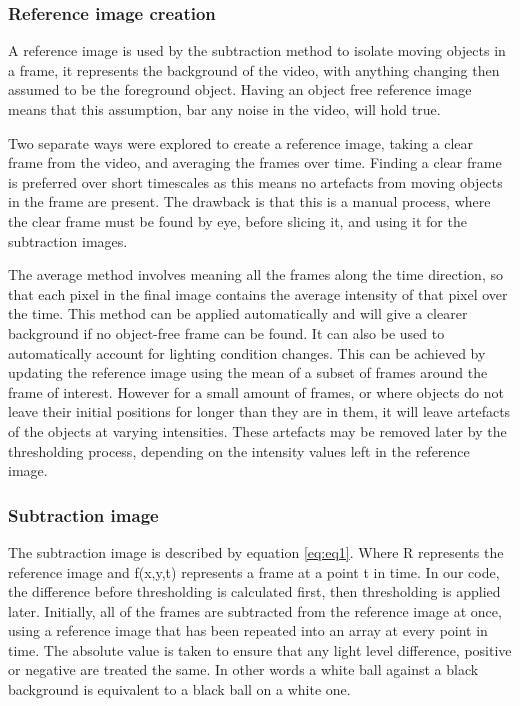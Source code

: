 \documentclass{article}
\begin{document}
\subsubsection{Reference image creation}

A reference image is used by the subtraction method to isolate moving objects in a frame, it represents the background of the video, with anything changing then assumed to be the foreground object. Having an object free reference image means that this assumption, bar any noise in the video, will hold true.
 
Two separate ways were explored to create a reference image, taking a clear frame from the video, and averaging the frames over time. Finding a clear frame is preferred over short timescales as this means no artefacts from moving objects in the frame are present. The drawback is that this is a manual process, where the clear frame must be found by eye, before slicing it, and using it for the subtraction images. 

The average method involves meaning all the frames along the time direction, so that each pixel in the final image contains the average intensity of that pixel over the time. This method can be applied automatically and will give a clearer background if no object-free frame can be found. It can also be used to automatically account for lighting condition changes. This can be achieved by updating the reference image using the mean of a subset of frames around the frame of interest. However for a small amount of frames, or where objects do not leave their initial positions for longer than they are in them, it will leave artefacts of the objects at varying intensities. These artefacts may be removed later by the thresholding process, depending on the intensity values left in the reference image. 

\subsubsection{Subtraction image}

The subtraction image is described by equation \ref{eq:eq1}. Where R represents the reference image and f(x,y,t) represents a frame at a point t in time. In our code, the difference before thresholding is calculated first, then thresholding is applied later. Initially, all of the frames are subtracted from the reference image at once, using a reference image that has been repeated into an array at every point in time. The absolute value is taken to ensure that any light level difference, positive or negative are treated the same. In other words a white ball against a black background is equivalent to a black ball on a white one. 
\end{document}
